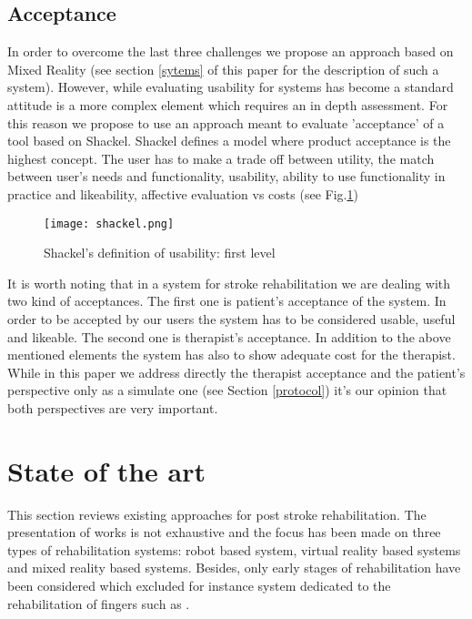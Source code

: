 \documentclass[preprint,authoryear,12pt]{elsarticle}
\begin{document}
\subsection{Acceptance}
\label{acceptance}

In order to overcome the last three challenges we propose an approach based on Mixed Reality (see section \ref{sytems} of this paper for the description of such a system).  However, while evaluating usability for systems has become a standard \citep{Nielsen, Macleod94, Bevan95} attitude is a more complex element which requires an in depth assessment. 
For this reason we propose to use an approach meant to evaluate 'acceptance' of a tool based on Shackel.
Shackel \citep{Shackel1991} defines a model where product acceptance is the highest concept. The user has to make a trade off between utility, the match between user's needs and functionality, usability, ability to use functionality in practice and likeability, affective evaluation vs costs (see Fig.\ref{fig:shackel})

\begin{figure}[h]
	\centering
		\texttt{[image: shackel.png]}
	\caption{Shackel's definition of usability: first level}
	\label{fig:shackel}
\end{figure}

It is worth noting that in a system for stroke rehabilitation we are dealing with two kind of acceptances. 
The first one is patient's acceptance of the system. In order to be accepted by our users  the system has to be considered usable, useful and likeable. The second one  is  therapist's acceptance.  In addition to the above mentioned elements the system has also to show adequate cost for the therapist. While in this paper we address directly the therapist acceptance and the patient's perspective only as a simulate one (see Section \ref{protocol}) it's our opinion that both perspectives are very important.


\section{State of the art}
\label{relworks}
This section reviews existing approaches for post stroke rehabilitation. The presentation of works is not exhaustive and the focus has been made on three types of rehabilitation systems: robot based system, virtual reality based systems and mixed reality based systems. Besides, only early stages of rehabilitation have been considered which excluded for instance system dedicated to the rehabilitation of fingers such as \citep{Cameirao2010}.
\end{document}
